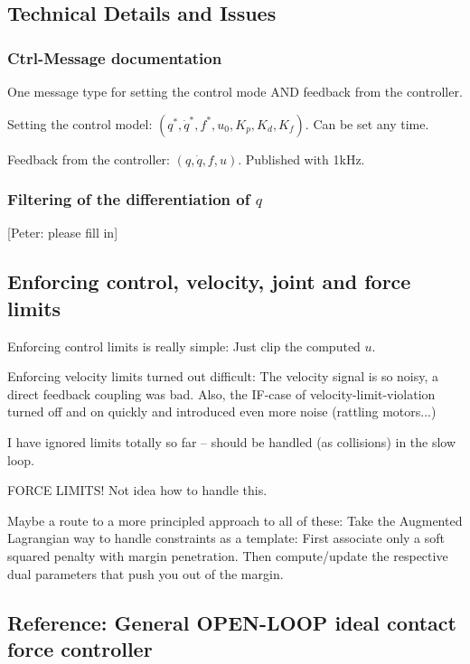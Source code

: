 \documentclass[10pt,fleqn,twoside]{article}
\begin{document}
{{\subsection{Technical Details and Issues}

\subsubsection{Ctrl-Message documentation}

One message type for setting the control mode AND feedback from the
controller.

Setting the control model: $(q^*, \dot q^*, f^*, u_0, K_p, K_d,
K_f)$. Can be set any time.

Feedback from the controller: $(q, \dot q, f, u)$. Published with 1kHz.


\subsubsection{Filtering of the differentiation of $q$}

[Peter: please fill in]

\subsection{Enforcing control, velocity, joint and force limits}

Enforcing control limits is really simple: Just clip the computed $u$.

Enforcing velocity limits turned out difficult: The velocity
signal is so noisy, a direct feedback coupling was bad. Also, the
IF-case of velocity-limit-violation turned off and on quickly and
introduced even more noise (rattling motors...)

I have ignored limits totally so far -- should be handled (as
collisions) in the slow loop.

FORCE LIMITS! Not idea how to handle this.

Maybe a route to a more principled approach to all of these: Take the
Augmented Lagrangian way to handle constraints as a template: First
associate only a soft squared penalty with margin penetration. Then
compute/update the respective dual parameters that push you out of the
margin.

\appendix

\subsection{Reference: General OPEN-LOOP ideal contact force controller}

}}
\end{document}
